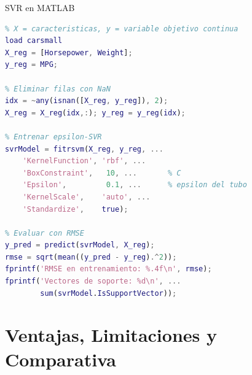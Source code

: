 \documentclass[aspectratio=169,xcolor=dvipsnames]{beamer}
\begin{document}
\begin{frame}[fragile]{SVR en MATLAB}
\begin{lstlisting}[language=Matlab, style=MATLABStyle]
% Datos de regresion: prediccion de precio
% X = caracteristicas, y = variable objetivo continua
load carsmall
X_reg = [Horsepower, Weight];
y_reg = MPG;

% Eliminar filas con NaN
idx = ~any(isnan([X_reg, y_reg]), 2);
X_reg = X_reg(idx,:); y_reg = y_reg(idx);

% Entrenar epsilon-SVR
svrModel = fitrsvm(X_reg, y_reg, ...
    'KernelFunction', 'rbf', ...
    'BoxConstraint',   10, ...       % C
    'Epsilon',         0.1, ...      % epsilon del tubo
    'KernelScale',    'auto', ...
    'Standardize',    true);

% Evaluar con RMSE
y_pred = predict(svrModel, X_reg);
rmse = sqrt(mean((y_pred - y_reg).^2));
fprintf('RMSE en entrenamiento: %.4f\n', rmse);
fprintf('Vectores de soporte: %d\n', ...
        sum(svrModel.IsSupportVector));
\end{lstlisting}
\end{frame}

\section{Ventajas, Limitaciones y Comparativa}
\end{document}
